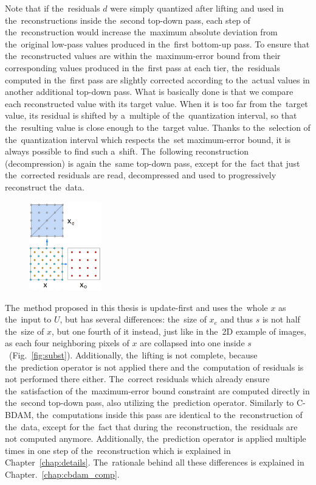 Note that if the~residuals $d$ were simply quantized after lifting and used in the~reconstructions inside the~second top-down pass, each step of the~reconstruction would increase the~maximum absolute deviation from the~original low-pass values produced in the~first bottom-up pass. To ensure that the~reconstructed values are within the~maximum-error bound from their corresponding values produced in the~first pass at each tier, the~residuals computed in the~first pass are slightly corrected according to the~actual values in another additional top-down pass. What is basically done is that we compare each reconstructed value with its target value. When it is too far from the~target value, its residual is shifted by a~multiple of the~quantization interval, so that the~resulting value is close enough to the~target value. Thanks to the~selection of the~quantization interval which respects the~set maximum-error bound, it is always possible to find such a~shift. The~following reconstruction (decompression) is again the~same top-down pass, except for the~fact that just the~corrected residuals are read, decompressed and used to progressively reconstruct the~data.

\begin{figure}
	\includegraphics[width=0.28\textwidth]{figures/cbdam_lifting.png}\centering
	\label{fig:cbdam_lifting}
\end{figure}



The~method proposed in this thesis is update-first and uses the~whole $x$ as the~input to $U$, but has several differences: the~size of $x_e$ and thus $s$ is not half the~size of $x$, but one fourth of it instead, just like in the~2D example of images, as each four neighboring pixels of $x$ are collapsed into one inside $s$~(Fig.~\ref{fig:subst}). Additionally, the~lifting is not complete, because the~prediction operator is not applied there and the~computation of residuals is not performed there either. The~correct residuals which already ensure the~satisfaction of the~maximum-error bound constraint are computed directly in the~second top-down pass, also utilizing the~prediction operator. Similarly to C-BDAM, the~computations inside this pass are identical to the~reconstruction of the~data, except for the~fact that during the~reconstruction, the~residuals are not computed anymore. Additionally, the~prediction operator is applied multiple times in one step of the~reconstruction which is explained in Chapter~\ref{chap:details}. The~rationale behind all these differences is explained in Chapter.~\ref{chap:cbdam_comp}.

